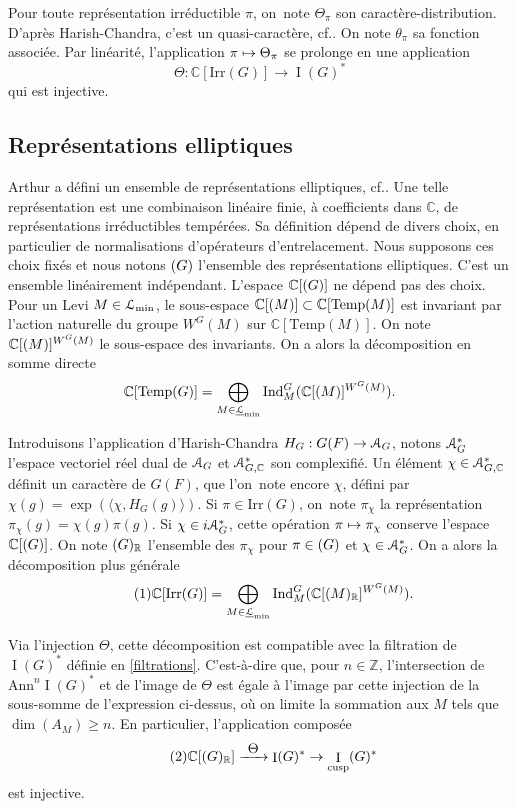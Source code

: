 \documentclass[11pt]{article}
\newcommand{\cf}{cf.\xspace}
\numberwithin{equation}{section}\providecommand{\og}{«\,}\providecommand{\fg}{\,»}
\let\mathcal \EuScript
\newcommand{\NoChangel}[1]{%
\expandafter\let\csname old\string#1\endcsname=#1
\let#1=\relax
\newcommand{#1}{\mathcode`l="716C\csname old\string#1\endcsname\mathcode`l="7160 }%
}
\let\<\langle
\let\>\rangle
\let\oldS\S
\renewcommand{\S}{\oldS\,}
\newcommand\mto{\mathchoice{\longmapsto}{\mapsto}{\mapsto}{\mapsto}}
\def\To#1{\mathchoice{\xrightarrow{\textstyle\kern4pt#1\kern3pt}}{\stackrel{#1}{\longrightarrow}}{}{}}
\newcommand{\Ann}{\mathrm{Ann}}
\newcommand{\cusp}{\mathrm{cusp}}
\newcommand{\Ell}{\mathrm{Ell}} \NoChangel{\Ell}
\newcommand{\Ind}{\mathrm{Ind}}
\newcommand{\Irr}{\mathrm{Irr}}
\newcommand{\Temp}{\mathrm{Temp}}
\DeclareMathOperator{\rI}{I}
\newcommand{\cA}{\mathcal{A}}
\newcommand{\cL}{\mathcal{L}}
\newcommand{\CC}{\mathbb{C}}
\newcommand{\ZZ}{\mathbb{Z}}
\newcommand{\RR}{\mathbb{R}}
\theoremstyle{plain}
\theoremstyle{definition}
\begin{document}
Pour toute représentation irréductible $\pi$, on~note $\Theta_{\pi}$
son caractère-distribution. D'après Harish-Chandra, c'est un quasi-caractère, \cf \cite[Th.\,16.2]{HC}. On note $\theta_{\pi}$ sa fonction associée. Par linéarité, l'application $\pi\mto \Theta_{\pi}$ se prolonge en une application
\[
\Theta:\CC[\Irr(G)]\to \rI(G)^*
\]
qui est injective.

\subsection{Représentations elliptiques}\label{representationselliptiques}
Arthur a défini un ensemble de \og représentations elliptiques\fg, \cf \cite[\S3]{A2}. Une telle représentation est une combinaison linéaire finie, à coefficients dans $\CC$, de représentations irréductibles tempérées. Sa définition dépend de divers choix, en particulier de normalisations d'opérateurs d'entrelacement. Nous supposons ces choix fixés et nous notons $\Ell(G)$ l'ensemble des représentations ellip\-ti\-ques. C'est un ensemble linéairement indépendant. L'espace $\CC[\Ell(G)]$ ne dépend pas des choix. Pour un Levi $M\in \cL_{\min}$, le sous-espace $\CC[\Ell(M)]\subset \CC[\Temp(M)]$ est invariant par l'action naturelle du groupe $ W^G(M)$ sur $\CC[\Temp(M)]$. On note $\CC[\Ell(M)]^{W^G(M)}$ le sous-espace des invariants. On a alors la décomposition en somme directe
\[
\CC[\Temp(G)]=\bigoplus_{M\in\underline{\cL}_{\min}}\Ind_{M}^G(\CC[\Ell(M)]^{W^G(M)}).
\]

Introduisons l'application d'Harish-Chandra $H_{G}:G(F)\to \cA_{G}$, notons $\cA_{G}^*$ l'espace vectoriel réel dual de $\cA_{G}$ et $\cA_{G,\CC}^*$ son complexifié. Un élément $\chi\in \cA_{G,\CC}^*$ définit un caractère de $G(F)$, que l'on~note encore $\chi$, défini par $\chi(g)=\exp(\<\chi,H_{G}(g)\>)$. Si $\pi\in \Irr(G)$, on~note $\pi_{\chi}$ la représentation $\pi_{\chi}(g)=\chi(g)\pi(g)$. Si $\chi\in i\cA_{G}^*$, cette opération $\pi\mto \pi_{\chi}$ conserve l'espace $\CC[\Ell(G)]$. On note $\Ell(G)_{\RR}$ l'ensemble des $\pi_{\chi}$ pour $\pi\in \Ell(G)$ et $\chi\in \cA_{G}^*$. On a alors la décomposition plus générale
\begin{equation}\tag{1}\label{representationselliptiques1}
\CC[\Irr(G)]=\bigoplus_{M\in\underline{\cL}_{\min}}\Ind_{M}^G(\CC[\Ell(M)_{\RR}]^{W^G(M)}).
\end{equation}

Via l'injection $\Theta$, cette décomposition est compatible avec la filtration de $\rI(G)^*$ définie en \ref{filtrations}. C'est-à-dire que, pour $n\in \ZZ$, l'intersection de $\Ann^n\rI(G)^*$ et de l'image de $\Theta$ est égale à l'image par cette injection de la sous-somme de l'expression ci-dessus, où on limite la sommation aux $M$ tels que $\dim(A_{M})\geq n$. En particulier, l'application composée
\begin{equation}\tag{2}\label{representationselliptiques2}
\CC[\Ell(G)_{\RR}]\To{\Theta}\rI(G)^*\to \rI_{\cusp}(G)^*
\end{equation}
est injective.
\end{document}

